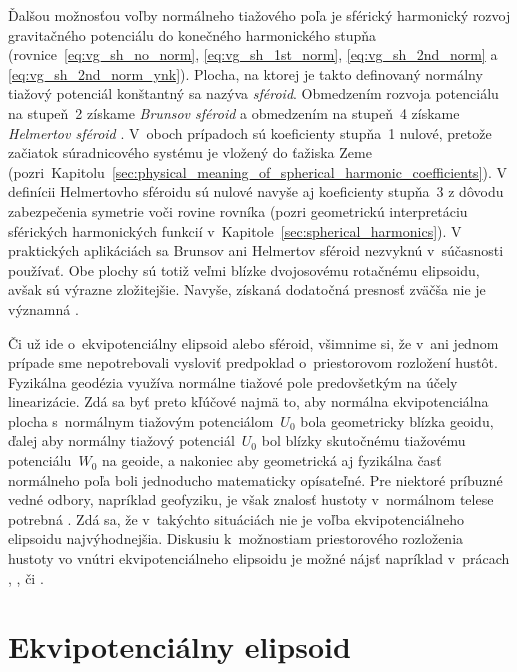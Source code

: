 \documentclass[a4paper,12pt]{book}
\begin{document}
Ďalšou možnosťou voľby normálneho tiažového poľa je sférický harmonický rozvoj 
gravitačného potenciálu do konečného harmonického stupňa 
(rovnice~\ref{eq:vg_sh_no_norm}, \ref{eq:vg_sh_1st_norm}, 
\ref{eq:vg_sh_2nd_norm} a \ref{eq:vg_sh_2nd_norm_ynk}).  Plocha, na ktorej je 
takto definovaný normálny tiažový potenciál konštantný sa nazýva 
\emph{sféroid}.  Obmedzením rozvoja potenciálu na stupeň~2 získame 
\emph{Brunsov sféroid} a obmedzením na stupeň~4 získame \emph{Helmertov 
sféroid} \parencite{Moritz1967}.  V~oboch prípadoch sú koeficienty stupňa~1 
nulové, pretože začiatok súradnicového systému je vložený do ťažiska Zeme 
(pozri~Kapitolu~\ref{sec:physical_meaning_of_spherical_harmonic_coefficients}).  
V definícii Helmertovho sféroidu sú nulové navyše aj koeficienty stupňa~3 
z dôvodu zabezpečenia symetrie voči rovine rovníka (pozri geometrickú 
interpretáciu sférických harmonických funkcií 
v~Kapitole~\ref{sec:spherical_harmonics}).   V praktických aplikáciách sa  
Brunsov ani Helmertov sféroid nezvyknú v~súčasnosti používať.  Obe plochy sú 
totiž veľmi blízke dvojosovému rotačnému elipsoidu, avšak sú výrazne 
zložitejšie.  Navyše, získaná dodatočná presnosť zväčša nie je významná 
\parencite{Moritz1967}.

Či už ide o~ekvipotenciálny elipsoid alebo sféroid, všimnime si, že v~ani 
jednom prípade sme nepotrebovali vysloviť predpoklad o~priestorovom rozložení 
hustôt.  Fyzikálna geodézia využíva normálne tiažové pole predovšetkým na účely 
linearizácie.  Zdá sa byť preto kľúčové najmä to, aby normálna ekvipotenciálna 
plocha s~normálnym tiažovým potenciálom~$U_0$ bola geometricky blízka geoidu, 
ďalej aby normálny tiažový potenciál~$U_0$ bol blízky skutočnému tiažovému 
potenciálu~$W_0$ na geoide, a nakoniec aby geometrická aj fyzikálna časť 
normálneho poľa boli jednoducho matematicky opísateľné.  Pre niektoré príbuzné 
vedné odbory, napríklad geofyziku, je však znalosť hustoty v~normálnom telese 
potrebná \parencite{Karcol2017}.  Zdá sa, že v~takýchto situáciách nie je voľba 
ekvipotenciálneho elipsoidu najvýhodnejšia.  Diskusiu k~možnostiam 
priestorového rozloženia hustoty vo vnútri ekvipotenciálneho elipsoidu je možné 
nájsť napríklad v~prácach \textcite{MoritzTheFigureOfTheEarth}, 
\textcite{TorgeGeodesy}, \textcite{Conway2000} či \textcite{Karcol2017}.



\section{Ekvipotenciálny elipsoid}
\label{sec:equipotential_ellipsoid}
\end{document}
